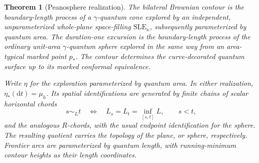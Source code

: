 \documentclass[11pt]{article}
\numberwithin{equation}{section}
\newtheorem{theorem}{Theorem}[section]
\theoremstyle{definition}
\theoremstyle{remark}
\newcommand{\1}{\mathbf 1}
\begin{document}
\begin{theorem}[Peanosphere realization]\label{enc:peanosphere}
The bilateral Brownian contour is the boundary-length process of a
$\gamma$-quantum cone explored by an independent, unparameterized
whole-plane space-filling $\mathrm{SLE}_{\kappa}$, subsequently
parameterized by quantum area.  The duration-one excursion is the
boundary-length process of the ordinary unit-area $\gamma$-quantum sphere
explored in the same way from an area-typical marked point $p_*$.
The contour determines the curve-decorated quantum surface up to its
marked conformal equivalence.

Write $\eta$ for the exploration parameterized by quantum area.
In either realization, $\eta_*(\mathrm d t)=\mu_h$.  Its spatial identifications
are generated by finite chains of scalar horizontal chords
\begin{equation}\label{enc:chord-rule}
 s\sim_L t\quad\Longleftrightarrow\quad
 L_s=L_t=\inf_{[s,t]}L,
 \qquad s<t,
\end{equation}
and the analogous $R$-chords, with the usual endpoint identification for
the sphere.  The resulting quotient carries the topology of the plane,
or sphere, respectively.  Frontier arcs are parameterized by quantum
length, with running-minimum contour heights as their length coordinates.
\end{theorem}
\end{document}
